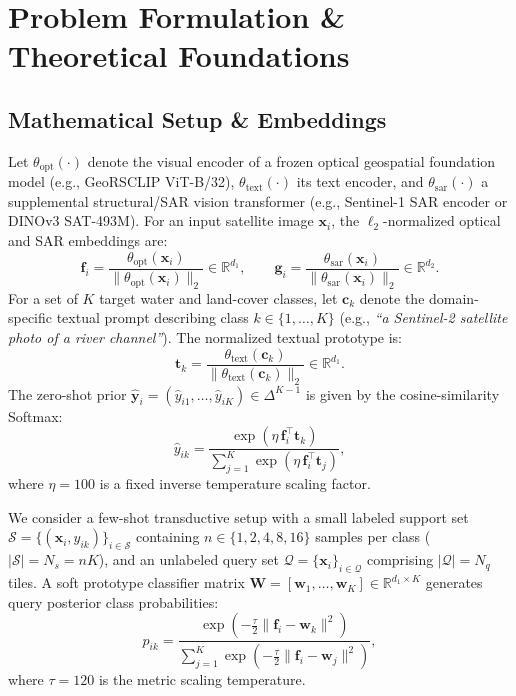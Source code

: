 \section{Problem Formulation \& Theoretical Foundations}
\label{sec:formulation}

\subsection{Mathematical Setup \& Embeddings}
Let $\theta_{\text{opt}}(\cdot)$ denote the visual encoder of a frozen optical geospatial foundation model (e.g., GeoRSCLIP ViT-B/32), $\theta_{\text{text}}(\cdot)$ its text encoder, and $\theta_{\text{sar}}(\cdot)$ a supplemental structural/SAR vision transformer (e.g., Sentinel-1 SAR encoder or DINOv3 SAT-493M). For an input satellite image $\bm{x}_i$, the $\ell_2$-normalized optical and SAR embeddings are:
\begin{equation}
    \bm{f}_i = \frac{\theta_{\text{opt}}(\bm{x}_i)}{\lVert \theta_{\text{opt}}(\bm{x}_i) \rVert_2} \in \mathbb{R}^{d_1}, \qquad \bm{g}_i = \frac{\theta_{\text{sar}}(\bm{x}_i)}{\lVert \theta_{\text{sar}}(\bm{x}_i) \rVert_2} \in \mathbb{R}^{d_2}.
    \label{eq:embeddings}
\end{equation}
For a set of $K$ target water and land-cover classes, let $\bm{c}_k$ denote the domain-specific textual prompt describing class $k \in \{1,\dots,K\}$ (e.g., \emph{``a Sentinel-2 satellite photo of a river channel''}). The normalized textual prototype is:
\begin{equation}
    \bm{t}_k = \frac{\theta_{\text{text}}(\bm{c}_k)}{\lVert \theta_{\text{text}}(\bm{c}_k) \rVert_2} \in \mathbb{R}^{d_1}.
    \label{eq:text_proto}
\end{equation}
The zero-shot prior $\hat{\bm{y}}_i = (\hat{y}_{i1}, \dots, \hat{y}_{iK}) \in \Delta^{K-1}$ is given by the cosine-similarity Softmax:
\begin{equation}
    \hat{y}_{ik} = \frac{\exp(\eta\, \bm{f}_i^{\top} \bm{t}_k)}{\sum_{j=1}^{K} \exp(\eta\, \bm{f}_i^{\top} \bm{t}_j)},
    \label{eq:zeroshot}
\end{equation}
where $\eta = 100$ is a fixed inverse temperature scaling factor.

We consider a few-shot transductive setup with a small labeled support set $\mathcal{S} = \{(\bm{x}_i, y_{ik})\}_{i \in \mathcal{S}}$ containing $n \in \{1, 2, 4, 8, 16\}$ samples per class ($|\mathcal{S}| = N_s = n K$), and an unlabeled query set $\mathcal{Q} = \{\bm{x}_i\}_{i \in \mathcal{Q}}$ comprising $|\mathcal{Q}| = N_q$ tiles. A soft prototype classifier matrix $\mathbf{W} = [\bm{w}_1, \dots, \bm{w}_K] \in \mathbb{R}^{d_1 \times K}$ generates query posterior class probabilities:
\begin{equation}
    p_{ik} = \frac{\exp(-\tfrac{\tau}{2} \lVert \bm{f}_i - \bm{w}_k \rVert^2)}{\sum_{j=1}^{K} \exp(-\tfrac{\tau}{2} \lVert \bm{f}_i - \bm{w}_j \rVert^2)},
    \label{eq:posterior}
\end{equation}
where $\tau = 120$ is the metric scaling temperature.


